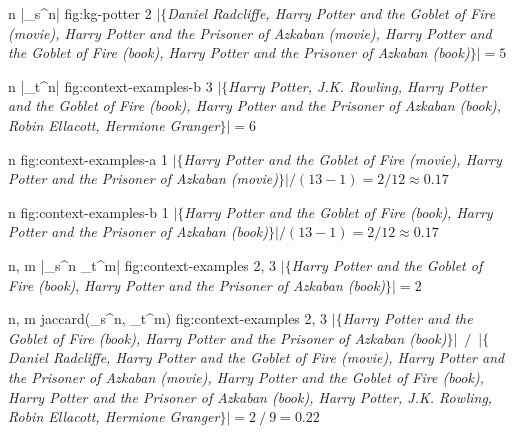{n}
{|\Eset{}_s^n|}
{fig:kg-potter}
{2}
{$|\{$\textit{Daniel Radcliffe, Harry Potter and the Goblet of Fire (movie), Harry Potter and the Prisoner of Azkaban (movie), Harry Potter and the Goblet of Fire (book), Harry Potter and the Prisoner of Azkaban (book)}$\}| = 5$}


{n}
{|\Eset{}_t^n|}
{fig:context-examples-b}
{3}
{$|\{$\textit{Harry Potter, J.K. Rowling, Harry Potter and the Goblet of Fire (book), Harry Potter and the Prisoner of Azkaban (book), Robin Ellacott, Hermione Granger}$\}| = 6$}

{n}
{}
{fig:context-examples-a}
{1}
{$|\{$\textit{Harry Potter and the Goblet of Fire (movie), Harry Potter and the Prisoner of Azkaban (movie)}$\}| / (13 - 1) = 2 / 12 \approx 0.17$}

{n}
{}
{fig:context-examples-b}
{1}
{$|\{$\textit{Harry Potter and the Goblet of Fire (book), Harry Potter and the Prisoner of Azkaban (book)}$\}| / (13 - 1) = 2 / 12 \approx 0.17$}

{n, m}
{|\Eset{}_s^n \cap \Eset{}_t^m|}
{fig:context-examples}
{2, 3}
{$|\{$\textit{Harry Potter and the Goblet of Fire (book)}, \textit{Harry Potter and the Prisoner of Azkaban (book)}$\}| = 2$}

{n, m}
{jaccard(\Eset{}_s^n, \Eset{}_t^m)}
{fig:context-examples}
{2, 3}
{$|\{$\textit{Harry Potter and the Goblet of Fire (book), Harry Potter and the Prisoner of Azkaban (book)}$\}|$~$/$~$|\{$\textit{Daniel Radcliffe, Harry Potter and the Goblet of Fire (movie), Harry Potter and the Prisoner of Azkaban (movie), Harry Potter and the Goblet of Fire (book), Harry Potter and the Prisoner of Azkaban (book), Harry Potter, J.K. Rowling, Robin Ellacott, Hermione Granger}$\}| = 2~/~9 = 0.22$}

